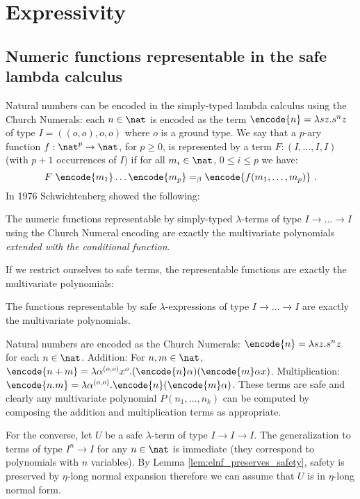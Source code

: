 \allowdisplaybreaks

\section{Expressivity}
\subsection{Numeric functions representable in the safe lambda
calculus}

Natural numbers can be encoded in the simply-typed lambda calculus
using the Church Numerals: each $n\in\nat$ is encoded as the term
$\encode{n} = \lambda s z. s^n z$ of type $I = ((o,o),o,o)$ where
$o$ is a ground type.
We say that a $p$-ary function $f : \nat^p \rightarrow \nat$, for $p \geq 0$,
is represented by a term $F : (I, \ldots, I, I)$ (with $p+1$ occurrences of $I$)
if for all $m_i \in \nat$, $0\leq i\leq p$ we have:
$$F~\encode{m_1} \ldots \encode{m_p} =_\beta \encode{f(m_1,\ldots, m_p)} \ .$$
In 1976 Schwichtenberg \cite{citeulike:622637}
showed the following:


\begin{theorem}[Schwichtenberg 1976]
The numeric functions representable by simply-typed $\lambda$-terms
of type $I\rightarrow \ldots \rightarrow I$ using the Church Numeral
encoding are exactly the multivariate polynomials \emph{extended
with the conditional function}.
\end{theorem}

If we restrict ourselves to safe terms, the representable functions
are exactly the multivariate polynomials:
\begin{theorem}
\label{thm:polychar} The functions representable by safe
$\lambda$-expressions of type $I\rightarrow \ldots \rightarrow I$
are exactly the multivariate polynomials.
\end{theorem}
\proof
  Natural numbers are encoded as the Church Numerals: $\encode{n} =
  \lambda s z. s^n z$ for each $n \in\nat$.  Addition: For $n,m \in \nat$, $\encode{n+m} =
  \lambda \alpha^{(o,o)} x^o . (\encode{n} \alpha) (\encode{m} \alpha
  x)$. Multiplication: $\encode{n . m} = \lambda \alpha^{(o,o)}
  . \encode{n} (\encode{m} \alpha)$. These terms are safe and
  clearly any multivariate polynomial $P(n_1, \ldots, n_k)$ can be
  computed by composing the addition and multiplication terms as
  appropriate.

For the converse, let $U$ be a safe $\lambda$-term of type
$I\rightarrow I\rightarrow I$.  The generalization to terms of type
$I^n \rightarrow I$ for any $n\in\nat$ is immediate (they correspond
to polynomials with $n$ variables). By Lemma
\ref{lem:elnf_preserves_safety}, safety is preserved by $\eta$-long
normal expansion therefore we can assume that $U$ is in $\eta$-long
normal form.


